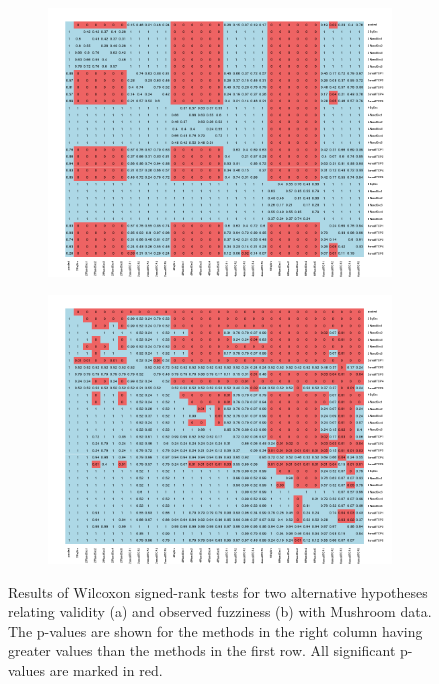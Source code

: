 \documentclass[main]{subfiles}
\begin{document}
\begin{figure}[h]
\centering
\begin{subfigure}{.5\textwidth}
  \centering
  \includegraphics[width=\linewidth]{images/heatmapMush}
\end{subfigure}%
\begin{subfigure}{.5\textwidth}
  \centering
  \includegraphics[width=\linewidth]{images/heatmapMush_eff}
\end{subfigure}%
\caption{Results of Wilcoxon signed-rank tests for two alternative hypotheses relating validity (a) and observed fuzziness (b) with Mushroom data. The p-values are shown for the methods in the right column having greater values than the methods in the first row. All significant p-values are marked in red.} \label{fig:testMush}
\end{figure}
\end{document}
